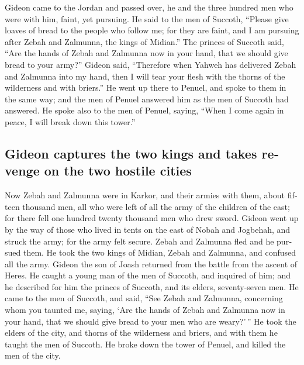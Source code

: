 \begin{paracol}{2}
\begin{otherlanguage}{english}
 Gideon came to the Jordan and passed over, he and the
three hundred men who were with him, faint, yet pursuing. 
He said to the men of Succoth, ``Please give loaves of bread to the
people who follow me; for they are faint, and I am pursuing after Zebah
and Zalmunna, the kings of Midian.''  The princes of
Succoth said, ``Are the hands of Zebah and Zalmunna now in your hand,
that we should give bread to your army?''  Gideon said,
``Therefore when Yahweh has delivered Zebah and Zalmunna into my hand,
then I will tear your flesh with the thorns of the wilderness and with
briers.''  He went up there to Penuel, and spoke to them
in the same way; and the men of Penuel answered him as the men of
Succoth had answered.  He spoke also to the men of Penuel,
saying, ``When I come again in peace, I will break down this tower.''

\hypertarget{gideon-captures-the-two-kings-and-takes-revenge-on-the-two-hostile-cities}{%
\subsection{Gideon captures the two kings and takes revenge on the two
hostile
cities}\label{gideon-captures-the-two-kings-and-takes-revenge-on-the-two-hostile-cities}}

 Now Zebah and Zalmunna were in Karkor, and their armies
with them, about fifteen thousand men, all who were left of all the army
of the children of the east; for there fell one hundred twenty thousand
men who drew sword.  Gideon went up by the way of those
who lived in tents on the east of Nobah and Jogbehah, and struck the
army; for the army felt secure.  Zebah and Zalmunna fled
and he pursued them. He took the two kings of Midian, Zebah and
Zalmunna, and confused all the army.  Gideon the son of
Joash returned from the battle from the ascent of Heres. 
He caught a young man of the men of Succoth, and inquired of him; and he
described for him the princes of Succoth, and its elders, seventy-seven
men.  He came to the men of Succoth, and said, ``See
Zebah and Zalmunna, concerning whom you taunted me, saying, `Are the
hands of Zebah and Zalmunna now in your hand, that we should give bread
to your men who are weary?'\,''  He took the elders of
the city, and thorns of the wilderness and briers, and with them he
taught the men of Succoth.  He broke down the tower of
Penuel, and killed the men of the city.


\end{otherlanguage}
\end{paracol}
